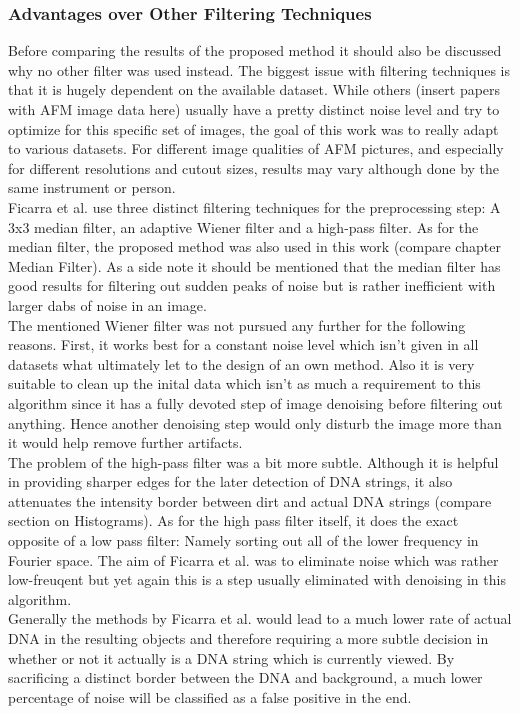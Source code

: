 \documentclass{article}
\begin{document}
\subsubsection{Advantages over Other Filtering Techniques}
Before comparing the results of the proposed method it should also be discussed why no other filter was used instead.
The biggest issue with filtering techniques is that it is hugely dependent on the available dataset. While others (insert papers with AFM image data here) usually have a pretty distinct noise level and try to optimize for this specific set of images, the goal of this work was to really adapt to various datasets. For different image qualities of AFM pictures, and especially for different resolutions and cutout sizes, results may vary although done by the same instrument or person. \\
Ficarra et al. \cite{ficarra2005automated} use three distinct filtering techniques for the preprocessing step: A 3x3 median filter, an adaptive Wiener filter and a high-pass filter. As for the median filter, the proposed method was also used in this work (compare chapter Median Filter). As a side note it should be mentioned that the median filter has good results for filtering out sudden peaks of noise but is rather inefficient with larger dabs of noise in an image. \\
The mentioned Wiener filter was not pursued any further for the following reasons. First, it works best for a constant noise level which isn't given in all datasets what ultimately let to the design of an own method. Also it is very suitable to clean up the inital data which isn't as much a requirement to this algorithm since it has a fully devoted step of image denoising before filtering out anything. Hence another denoising step would only disturb the image more than it would help remove further artifacts. \\
The problem of the high-pass filter was a bit more subtle. Although it is helpful in providing sharper edges for the later detection of DNA strings, it also attenuates the intensity border between dirt and actual DNA strings (compare section on Histograms). As for the high pass filter itself, it does the exact opposite of a low pass filter: Namely sorting out all of the lower frequency in Fourier space. The aim of Ficarra et al. \cite{ficarra2005automated} was to eliminate noise which was rather low-freuqent but yet again this is a step usually eliminated with denoising in this algorithm. \\
Generally the methods by Ficarra et al. would lead to a much lower rate of actual DNA in the resulting objects and therefore requiring a more subtle decision in whether or not it actually is a DNA string which is currently viewed. By sacrificing a distinct border between the DNA and background, a much lower percentage of noise will be classified as a false positive in the end.
\end{document}
